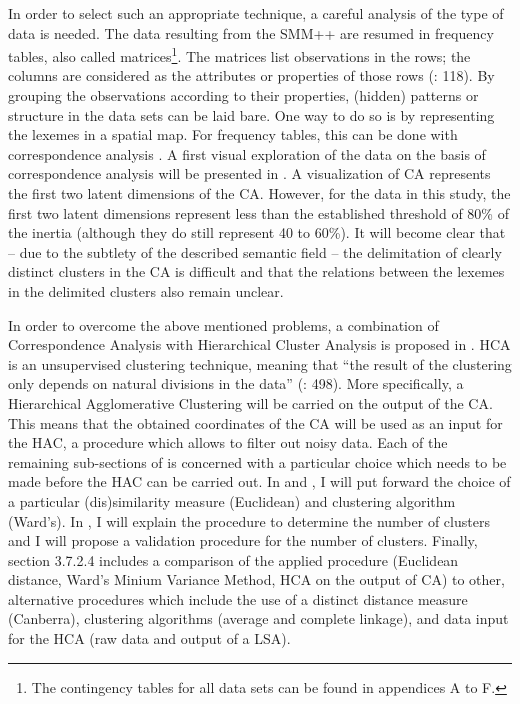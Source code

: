In order to select such an appropriate technique, a careful analysis of the type of data is needed. The data resulting from the SMM++ are resumed in frequency tables, also called matrices\footnote{The contingency tables for all data sets can be found in appendices A to F.}. The matrices list observations in the rows; the columns are considered as the attributes or properties of those rows (\citealt{baayen_analyzing_2008}: 118). By grouping the observations according to their properties, (hidden) patterns or structure in the data sets can be laid bare. One way to do so is by representing the lexemes in a spatial map. For frequency tables, this can be done with correspondence analysis \citep{greenacre_correspondence_2007}. A first visual exploration of the data on the basis of correspondence analysis will be presented in . A visualization of CA represents the first two latent dimensions of the CA. However, for the data in this study, the first two latent dimensions represent less than the established threshold of 80\% of the inertia (although they do still represent 40 to 60\%). It will become clear that – due to the subtlety of the described semantic field – the delimitation of clearly distinct clusters in the CA is difficult and that the relations between the lexemes in the delimited clusters also remain unclear.



In order to overcome the above mentioned problems, a combination of Correspondence Analysis with Hierarchical Cluster Analysis is proposed in . HCA is an unsupervised clustering technique, meaning that “the result of the clustering only depends on natural divisions in the data” (\citealt{manning_foundations_1999}: 498). More specifically, a Hierarchical Agglomerative Clustering will be carried on the output of the CA. This means that the obtained coordinates of the CA will be used as an input for the HAC, a procedure which allows to filter out noisy data. Each of the remaining sub-sections of  is concerned with a particular choice which needs to be made before the HAC can be carried out. In  and , I will put forward the choice of a particular (dis)similarity measure (Euclidean) and clustering algorithm (Ward’s). In , I will explain the procedure to determine the number of clusters and I will propose a validation procedure for the number of clusters. Finally, section 3.7.2.4 includes a comparison of the applied procedure (Euclidean distance, Ward’s Minium Variance Method, HCA on the output of CA) to other, alternative procedures which include the use of a distinct distance measure (Canberra), clustering algorithms (average and complete linkage), and data input for the HCA (raw data and output of a LSA).



